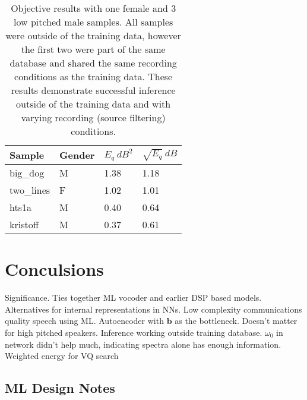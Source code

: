 \documentclass{article}
\begin{document}
\begin{table}[H]
\label{tab:ml_sd}
\centering
\begin{tabular}{l l l l}
\hline
Sample & Gender & $E_q \: dB^2$ & $\sqrt{E_q} \: dB$  \\
\hline
big\_dog & M & 1.38 & 1.18  \\
two\_lines & F & 1.02 & 1.01 \\
hts1a & M & 0.40 & 0.64 \\
kristoff & M & 0.37 & 0.61  \\
\hline
\end{tabular}
\caption{Objective results with one female and 3 low pitched male samples.  All samples were outside of the training data, however the first two were part of the same database and shared the same recording conditions as the training data. These results demonstrate successful inference outside of the training data and with varying recording (source filtering) conditions.}
\end{table}

\section{Conculsions}

Significance. Ties together ML vocoder and earlier DSP based models.  Alternatives for internal representations in NNs.  Low complexity communications quality speech using ML. Autoencoder with $\mathbf{b}$ as the bottleneck. Doesn't matter for high pitched speakers. Inference working outside training database. $\omega_0$ in network didn't help much, indicating spectra alone has enough information. Weighted energy for VQ search

\subsection{ML Design Notes}
\end{document}

